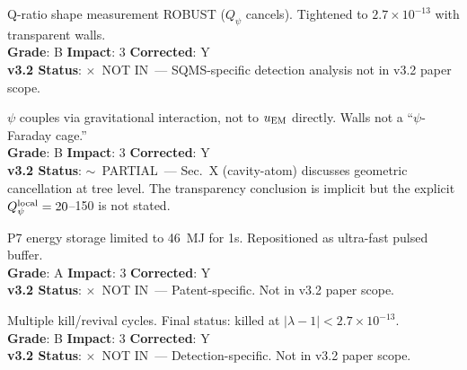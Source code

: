 \documentclass[11pt,a4paper]{article}
\newcommand{\vpartial}{\textcolor{statusPARTIAL}{$\sim$~PARTIAL}}
\newcommand{\vnot}{\textcolor{statusNOT}{$\times$~NOT IN}}
\begin{document}
\begin{tcolorbox}[colback=important!5,colframe=important,title=\textbf{F36: SQMS Absolute Bound Unreliable ($\sqrt{Q_\psi}$ Unconstrained)}]
Q-ratio shape measurement ROBUST ($Q_\psi$ cancels). Tightened to $2.7 \times 10^{-13}$ with transparent walls.\\
\textbf{Grade}: B \quad \textbf{Impact}: 3 \quad \textbf{Corrected}: Y\\
\textbf{v3.2 Status}: \vnot\ --- SQMS-specific detection analysis not in v3.2 paper scope.
\end{tcolorbox}

\begin{tcolorbox}[colback=important!5,colframe=important,title=\textbf{F37: SRF Cavity Walls Transparent to $\psi$}]
$\psi$ couples via gravitational interaction, not to $u_{\rm EM}$ directly. Walls not a ``$\psi$-Faraday cage.''\\
\textbf{Grade}: B \quad \textbf{Impact}: 3 \quad \textbf{Corrected}: Y\\
\textbf{v3.2 Status}: \vpartial\ --- Sec.~X (cavity-atom) discusses geometric cancellation at tree level. The transparency conclusion is implicit but the explicit $Q_\psi^{\rm local} = 20$--150 is not stated.
\end{tcolorbox}

\begin{tcolorbox}[colback=important!5,colframe=important,title=\textbf{F38: P7 1~GJ Spec INVALIDATED (Max 46~MJ for 1s Storage)}]
P7 energy storage limited to 46~MJ for 1s. Repositioned as ultra-fast pulsed buffer.\\
\textbf{Grade}: A \quad \textbf{Impact}: 3 \quad \textbf{Corrected}: Y\\
\textbf{v3.2 Status}: \vnot\ --- Patent-specific. Not in v3.2 paper scope.
\end{tcolorbox}

\begin{tcolorbox}[colback=important!5,colframe=important,title=\textbf{F39: P12 Multi-Cavity Superradiance --- Death and Revival Cycle}]
Multiple kill/revival cycles. Final status: killed at $|\lambda-1| < 2.7 \times 10^{-13}$.\\
\textbf{Grade}: B \quad \textbf{Impact}: 3 \quad \textbf{Corrected}: Y\\
\textbf{v3.2 Status}: \vnot\ --- Detection-specific. Not in v3.2 paper scope.
\end{tcolorbox}


\end{document}
